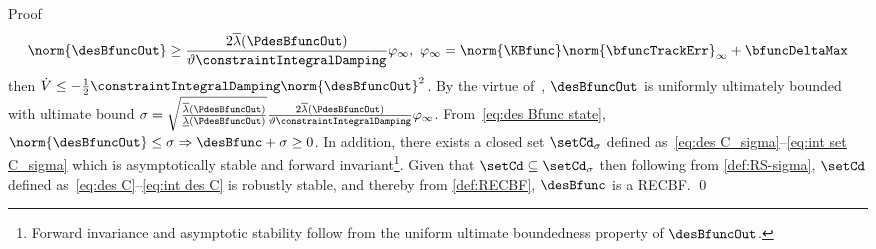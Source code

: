 \begin{custumProof}{Proof}
\begin{equation}
		\norm{\desBfuncOut}\geq\frac{2\overline{\lambda}(\PdesBfuncOut)}{\vartheta\constraintIntegralDamping}\varphi_\infty, \ \varphi_\infty = \norm{\KBfunc}\norm{\bfuncTrackErr}_\infty+\bfuncDeltaMax
	\end{equation}  then $\dot{V}\leq  -\frac{1}{2}\constraintIntegralDamping\norm{\desBfuncOut}^2$. 
	By the virtue of~\cite[Theorem~4.18]{khalil2002NonLinearSystems}, $\desBfuncOut $ is uniformly ultimately bounded with ultimate bound $\sigma=\sqrt{\frac{\overline{\lambda}(\PdesBfuncOut)}{\underline{\lambda}(\PdesBfuncOut)}}\frac{2\overline{\lambda}(\PdesBfuncOut)}{\vartheta\constraintIntegralDamping}\varphi_\infty$. From~\cref{eq:des Bfunc state}, $\norm{\desBfuncOut }\leq\sigma\Rightarrow\desBfunc +\sigma\geq0$. 
	In addition, there exists a closed set $\setCd_{\sigma}$  defined as~\cref{eq:des C_sigma}--\cref{eq:int set C_sigma} which is asymptotically stable and forward invariant\footnote{Forward invariance and asymptotic stability follow from the uniform ultimate boundedness property of $\desBfuncOut$.}.
	Given that $\setCd\subseteq\setCd_{\sigma}$ then following from \cref{def:RS-sigma}, $\setCd$ defined as~\cref{eq:des C}--\cref{eq:int des C} is robustly stable, and thereby from \cref{def:RECBF}, $\desBfunc$ is a RECBF.	\qed

\end{custumProof}
